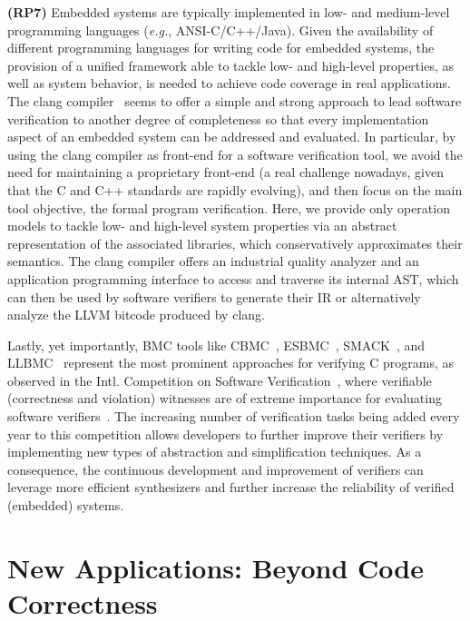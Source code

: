 \documentclass[format=acmsmall, review=false, screen=true]{acmart}
\begin{document}
{{\textbf{(RP7)} Embedded systems are typically implemented in low- and medium-level programming languages ({\it e.g.}, ANSI-C/C++/Java). Given the availability of different programming languages for writing code for embedded systems, the provision of a unified framework able to tackle low- and high-level properties, as well as system behavior, is needed to achieve code coverage in real applications. The clang compiler~\cite{Lopes:2014:GSL:2692607} seems to offer a simple and strong approach to lead software verification to another degree of completeness so that every implementation aspect of an embedded system can be addressed and evaluated. In particular, by using the clang compiler as front-end for a software verification tool, we avoid the need for maintaining a proprietary front-end (a real challenge nowadays, given that the C and C++ standards are rapidly evolving), and then focus on the main tool objective, the formal program verification. Here, we provide only operation models to tackle low- and high-level system properties via an abstract representation of the associated libraries, which conservatively approximates their semantics. The clang compiler offers an industrial quality analyzer and an application programming interface to access and traverse its internal AST, which can then be used by software verifiers to generate their IR or alternatively analyze the LLVM bitcode produced by clang. 

Lastly, yet importantly, BMC tools like CBMC~\cite{Clarke04}, ESBMC~\cite{MorseCNF13,MorseRCN014}, SMACK~\cite{Haran15}, and LLBMC~\cite{MerzFS12} represent the most prominent approaches for verifying C programs, as observed in the Intl. Competition on Software Verification~\cite{Beyer14,BeyerSVCOMP15,Beyer16}, where verifiable (correctness and violation) witnesses are of extreme importance for evaluating software verifiers~\cite{BeyerW15,RochaIFM12}. The increasing number of verification tasks being added every year to this competition allows developers to further improve their verifiers by implementing new types of abstraction and simplification techniques. As a consequence, the continuous development and improvement of verifiers can leverage more efficient synthesizers and further increase the reliability of verified (embedded) systems.

\section{New Applications: Beyond Code Correctness}
\label{Newapp}

}}
\end{document}
